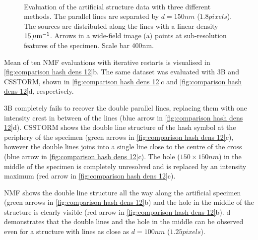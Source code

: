 %
\begin{figure}[!h]
	\centering
	\newcommand{\sizef}{.95}
	\newcommand{\wf}{.45\textwidth}
	\\
	\caption{Evaluation of the artificial structure data with three different methods. The parallel lines are separated by $d=150 \unit{nm}$ ($1.8 \unit{pixels}$). The sources are distributed along the lines with a linear density $15 \, \mathrm{\mu m}^{-1}$. Arrows in a wide-field image (a) points at sub-resolution features of the specimen. Scale bar 400\unit{nm}.}
	\label{fig:comparison hash dens 12}
\end{figure}
%
Mean of ten NMF evaluations with iterative restarts is visualised in \autoref{fig:comparison hash dens 12}b. The same dataset was evaluated with 3B and CSSTORM, shown in  \autoref{fig:comparison hash dens 12}c and \autoref{fig:comparison hash dens 12}d, respectively. 

3B completely fails to recover the double parallel lines, replacing them with one intensity crest in between of the lines (blue arrow in \autoref{fig:comparison hash dens 12}d). CSSTORM shows the double line structure of the hash symbol at the periphery of the specimen (green arrows in \autoref{fig:comparison hash dens 12}c), however the double lines joins into a single line close to the centre of the cross  (blue arrow in \autoref{fig:comparison hash dens 12}c). The hole ($150 \times 150 \unit{nm}$) in the middle of the specimen is completely unresolved and is replaced by an intensity maximum (red arrow in \autoref{fig:comparison hash dens 12}c). 

NMF shows the double line structure all the way along the artificial specimen (green arrows in \autoref{fig:comparison hash dens 12}b) and  the hole in the middle of the structure is clearly visible (red arrow in \autoref{fig:comparison hash dens 12}b). d demonstrates that the double lines and the hole in the middle can be observed even for a structure with lines as close as $d=100\unit{nm}$ ($1.25 \unit{pixels}$). 

